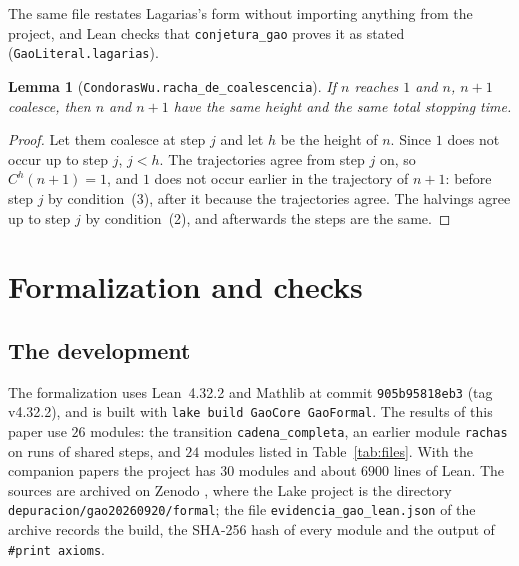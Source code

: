 \documentclass[11pt]{amsart}
\newtheorem{lemma}[theorem]{Lemma}
\theoremstyle{definition}
\theoremstyle{remark}
\newcommand{\lean}[1]{\nolinkurl{#1}}
\begin{document}
\noindent The same file restates Lagarias's form without importing anything from the project, and Lean checks that \lean{conjetura_gao} proves it as stated (\lean{GaoLiteral.lagarias}).

\begin{lemma}[\lean{CondorasWu.racha_de_coalescencia}]\label{lem:same-height}
If $n$ reaches $1$ and $n$, $n+1$ coalesce, then $n$ and $n+1$ have the same height and the same total stopping time.
\end{lemma}

\begin{proof}
Let them coalesce at step $j$ and let $h$ be the height of $n$. Since $1$ does not occur up to step $j$, $j<h$. The trajectories agree from step $j$ on, so $C^{h}(n+1)=1$, and $1$ does not occur earlier in the trajectory of $n+1$: before step $j$ by condition~(3), after it because the trajectories agree. The halvings agree up to step $j$ by condition~(2), and afterwards the steps are the same.
\end{proof}

\section{Formalization and checks}\label{sec:formal}

\subsection{The development}
The formalization uses Lean~4.32.2 and Mathlib at commit \texttt{905b95818eb3} (tag v4.32.2), and is built with \texttt{lake build GaoCore GaoFormal}. The results of this paper use $26$ modules: the transition \lean{cadena_completa}, an earlier module \texttt{rachas} on runs of shared steps, and $24$ modules listed in Table~\ref{tab:files}. With the companion papers the project has $30$ modules and about $6900$ lines of Lean. The sources are archived on Zenodo \cite{Artifact}, where the Lake project is the directory \lean{depuracion/gao20260920/formal}; the file \texttt{evidencia\_gao\_lean.json} of the archive records the build, the SHA-256 hash of every module and the output of \texttt{\#print axioms}.
\end{document}
